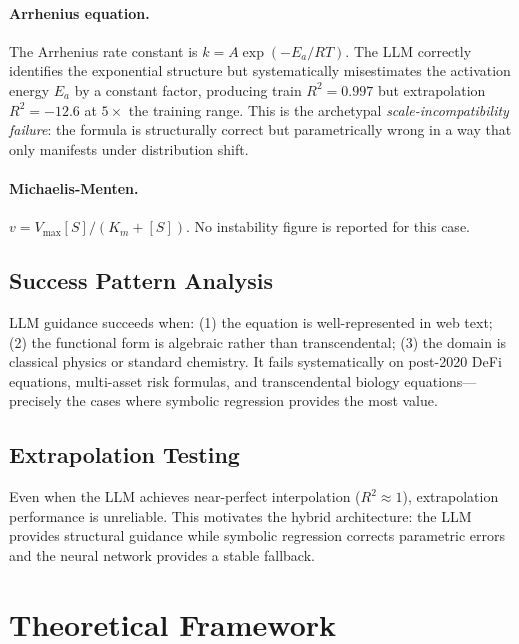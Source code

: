 \documentclass[twoside,11pt]{article}
\newcommand{\Rsq}{R^{2}}
\begin{document}
\paragraph{Arrhenius equation.}
The Arrhenius rate constant is $k = A \exp\!(-E_a/RT)$. The LLM correctly identifies the exponential structure but systematically misestimates the activation energy $E_a$ by a constant factor, producing train $\Rsq = 0.997$ but extrapolation $\Rsq = -12.6$ at $5\times$ the training range. This is the archetypal \emph{scale-incompatibility failure}: the formula is structurally correct but parametrically wrong in a way that only manifests under distribution shift.

\paragraph{Michaelis-Menten.}
$v = V_{\max}[S]/(K_m + [S])$. No instability figure is reported for this case.

\subsection{Success Pattern Analysis}\label{subsec:success-pattern-analysis}
\label{sec:llm_success}

LLM guidance succeeds when: (1) the equation is well-represented in web text; (2) the functional form is algebraic rather than transcendental; (3) the domain is classical physics or standard chemistry. It fails systematically on post-2020 DeFi equations, multi-asset risk formulas, and transcendental biology equations---precisely the cases where symbolic regression provides the most value.

\subsection{Extrapolation Testing}\label{subsec:extrapolation-testing}
\label{sec:llm_extrap}

Even when the LLM achieves near-perfect interpolation ($\Rsq \approx 1$), extrapolation performance is unreliable. This motivates the hybrid architecture: the LLM provides structural guidance while symbolic regression corrects parametric errors and the neural network provides a stable fallback.

\section{Theoretical Framework}
\label{sec:theory}
\end{document}
